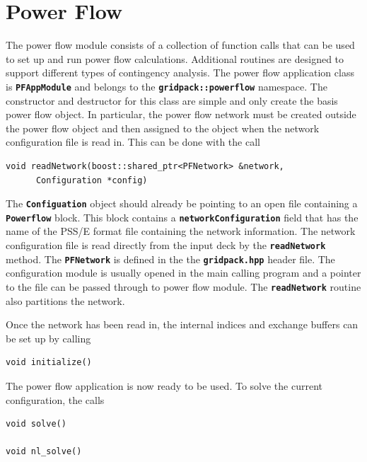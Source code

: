 \documentclass[12pt]{report} %
\begin{document}
\section{Power Flow}

The power flow module consists of a collection of function calls that can be used to set up and run power flow calculations. Additional routines are designed to support different types of contingency analysis. The power flow application class is \texttt{\textbf{PFAppModule}} and belongs to the \texttt{\textbf{gridpack::powerflow}} namespace. The constructor and destructor for this class are simple and only create the basis power flow object. In particular, the power flow network must be created outside the power flow object and then assigned to the object when the network configuration file is read in. This can be done with the call

{
\color{red}
\begin{Verbatim}[fontseries=b]
void readNetwork(boost::shared_ptr<PFNetwork> &network,
      Configuration *config)
\end{Verbatim}
}

The \texttt{\textbf{Configuation}} object should already be pointing to an open file containing a \texttt{\textbf{Powerflow}} block. This block contains a \texttt{\textbf{networkConfiguration}} field that has the name of the PSS/E format file containing the network information. The network configuration file is read directly from the input deck by the \texttt{\textbf{readNetwork }}method. The \texttt{\textbf{PFNetwork}} is defined in the the \texttt{\textbf{gridpack.hpp}} header file. The configuration module is usually opened in the main calling program and a pointer to the file can be passed through to power flow module. The \texttt{\textbf{readNetwork}} routine also partitions the network.

Once the network has been read in, the internal indices and exchange buffers can be set up by calling

{
\color{red}
\begin{Verbatim}[fontseries=b]
void initialize()
\end{Verbatim}
}

The power flow application is now ready to be used. To solve the current configuration, the calls

{
\color{red}
\begin{Verbatim}[fontseries=b]
void solve()

void nl_solve()
\end{Verbatim}
}
\end{document}
